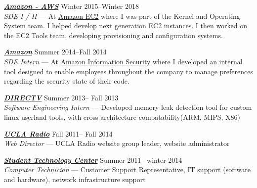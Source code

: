\documentclass[line,letterpaper]{resume}
\begin{document}
\begin{resume}
	{\sl\textbf{\href{https://aws.amazon.com/}{Amazon - AWS}}} \hfill Winter 2015--Winter 2018\\
    \emph{SDE I / II } --- At \underline{\href{http://aws.amazon.com/ec2}
	{Amazon EC2}} where I was part of the Kernel and Operating System team. I helped
	develop next generation EC2 instances. I then worked on the EC2 Tools team,
        developing provisioning and configuration systems.

	{\sl\textbf{\href{www.amazon.com}{Amazon}}} \hfill Summer 2014--Fall 2014\\
    \emph{SDE Intern} --- At \underline{\href{https://www.amazon.jobs/en/teams/infosec}
    {Amazon Information Security}} where I developed an internal tool designed to
	enable employees throughout the company to manage preferences regarding the
	security state of their code.

    {\sl\textbf{\href{www.directv.com}{DIRECTV}}} \hfill Summer 2013-- Fall 2013\\
    \emph{Software Engineering Intern}
    ---  Developed memory leak detection tool for custom linux userland tools,
	with cross architecture compatability(ARM, MIPS, X86)

    {\sl\textbf{\href{www.uclaradio.com}{UCLA Radio}}} \hfill Fall 2011-- Fall 2014\\
    \emph{Web Director} --- UCLA Radio website group leader, website administrator

    {\sl\textbf{\href{https://housing.ucla.edu/residence-hall-computing}
	{Student Technology Center}}} \hfill Summer 2011-- winter 2014\\
    \emph{Computer Technician} --- Customer Support Representative,
IT support (software and hardware), network infrastructure support
    \vspace{-6pt}



\end{resume}
\end{document}
